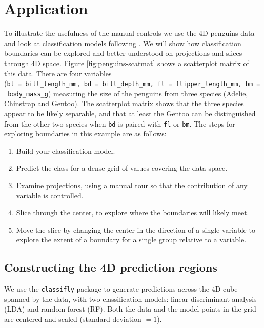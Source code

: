 \documentclass[]{interact}
\theoremstyle{plain}%
\theoremstyle{definition}
\theoremstyle{remark}
\providecommand{\tightlist}{%
  \setlength{\itemsep}{0pt}\setlength{\parskip}{0pt}}
\def\tightlist{}
\begin{document}
\hypertarget{sec:examples}{%
\section{Application}\label{sec:examples}}

To illustrate the usefulness of the manual controls we use the 4D
penguins data \citep{penguins} and look at classification models
following \citet{sam11271}. We will show how classification boundaries
can be explored and better understood on projections and slices through
4D space. Figure \ref{fig:penguins-scatmat} shows a scatterplot matrix
of this data. There are four variables
(\texttt{bl\ =\ bill\_length\_mm,\ bd\ =\ bill\_depth\_mm,\ fl\ =\ flipper\_length\_mm,\ bm\ =\ body\_mass\_g})
measuring the size of the penguins from three species (Adelie, Chinstrap
and Gentoo). The scatterplot matrix shows that the three species appear
to be likely separable, and that at least the Gentoo can be
distinguished from the other two species when \texttt{bd} is paired with
\texttt{fl} or \texttt{bm}. The steps for exploring boundaries in this
example are as follows:

\begin{enumerate}
\def\labelenumi{\arabic{enumi}.}
\tightlist
\item
  Build your classification model.
\item
  Predict the class for a dense grid of values covering the data space.
\item
  Examine projections, using a manual tour so that the contribution of
  any variable is controlled.
\item
  Slice through the center, to explore where the boundaries will likely
  meet.
\item
  Move the slice by changing the center in the direction of a single
  variable to explore the extent of a boundary for a single group
  relative to a variable.
\end{enumerate}

\hypertarget{constructing-the-4d-prediction-regions}{%
\subsection{Constructing the 4D prediction
regions}\label{constructing-the-4d-prediction-regions}}

We use the \texttt{classifly} package \citep{classifly} to generate
predictions across the 4D cube spanned by the data, with two
classification models: linear discriminant analysis (LDA) and random
forest (RF). Both the data and the model points in the grid are centered
and scaled (standard deviation \(= 1\)).
\end{document}
